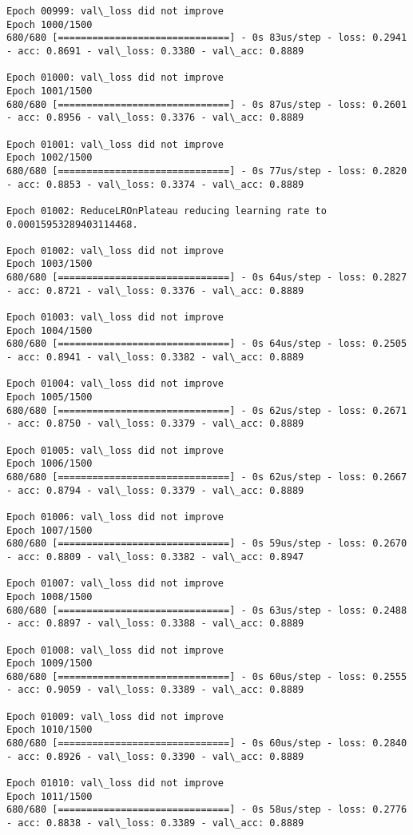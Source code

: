 \documentclass[11pt]{article}
\begin{document}
\begin{Verbatim}[commandchars=\\\{\}]
Epoch 00999: val\_loss did not improve
Epoch 1000/1500
680/680 [==============================] - 0s 83us/step - loss: 0.2941 - acc: 0.8691 - val\_loss: 0.3380 - val\_acc: 0.8889

Epoch 01000: val\_loss did not improve
Epoch 1001/1500
680/680 [==============================] - 0s 87us/step - loss: 0.2601 - acc: 0.8956 - val\_loss: 0.3376 - val\_acc: 0.8889

Epoch 01001: val\_loss did not improve
Epoch 1002/1500
680/680 [==============================] - 0s 77us/step - loss: 0.2820 - acc: 0.8853 - val\_loss: 0.3374 - val\_acc: 0.8889

Epoch 01002: ReduceLROnPlateau reducing learning rate to 0.00015953289403114468.

Epoch 01002: val\_loss did not improve
Epoch 1003/1500
680/680 [==============================] - 0s 64us/step - loss: 0.2827 - acc: 0.8721 - val\_loss: 0.3376 - val\_acc: 0.8889

Epoch 01003: val\_loss did not improve
Epoch 1004/1500
680/680 [==============================] - 0s 64us/step - loss: 0.2505 - acc: 0.8941 - val\_loss: 0.3382 - val\_acc: 0.8889

Epoch 01004: val\_loss did not improve
Epoch 1005/1500
680/680 [==============================] - 0s 62us/step - loss: 0.2671 - acc: 0.8750 - val\_loss: 0.3379 - val\_acc: 0.8889

Epoch 01005: val\_loss did not improve
Epoch 1006/1500
680/680 [==============================] - 0s 62us/step - loss: 0.2667 - acc: 0.8794 - val\_loss: 0.3379 - val\_acc: 0.8889

Epoch 01006: val\_loss did not improve
Epoch 1007/1500
680/680 [==============================] - 0s 59us/step - loss: 0.2670 - acc: 0.8809 - val\_loss: 0.3382 - val\_acc: 0.8947

Epoch 01007: val\_loss did not improve
Epoch 1008/1500
680/680 [==============================] - 0s 63us/step - loss: 0.2488 - acc: 0.8897 - val\_loss: 0.3388 - val\_acc: 0.8889

Epoch 01008: val\_loss did not improve
Epoch 1009/1500
680/680 [==============================] - 0s 60us/step - loss: 0.2555 - acc: 0.9059 - val\_loss: 0.3389 - val\_acc: 0.8889

Epoch 01009: val\_loss did not improve
Epoch 1010/1500
680/680 [==============================] - 0s 60us/step - loss: 0.2840 - acc: 0.8926 - val\_loss: 0.3390 - val\_acc: 0.8889

Epoch 01010: val\_loss did not improve
Epoch 1011/1500
680/680 [==============================] - 0s 58us/step - loss: 0.2776 - acc: 0.8838 - val\_loss: 0.3389 - val\_acc: 0.8889


\end{Verbatim}
\end{document}

